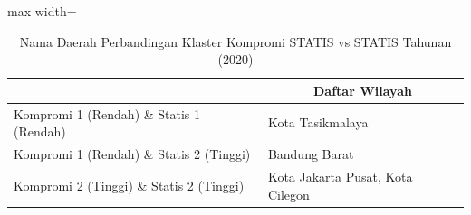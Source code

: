 \begin{table}[H]
\centering
\caption{Nama Daerah Perbandingan Klaster Kompromi STATIS vs STATIS Tahunan (2020)} \label{tab:sample1comp_statis_name_2020}
\begin{adjustbox}{max width=\textwidth}
\begin{tabular}{|>{\centering\arraybackslash}p{4cm}|p{10cm}|}
\hline
\multicolumn{1}{|c|}{\textbf{Kategori}} & \multicolumn{1}{c|}{\textbf{Daftar Wilayah}} \\
\hline
Kompromi 1 (Rendah) \& Statis 1 (Rendah) & Kota Tasikmalaya \\
\hline
Kompromi 1 (Rendah) \& Statis 2 (Tinggi) & Bandung Barat \\
\hline
Kompromi 2 (Tinggi) \& Statis 2 (Tinggi) & Kota Jakarta Pusat, Kota Cilegon \\
\hline
\end{tabular}
\end{adjustbox}
\end{table}